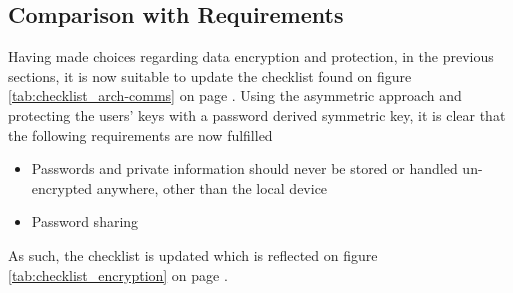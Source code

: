 		\subsection{Comparison with Requirements}
			Having made choices regarding data encryption and protection, in the previous sections, it is now suitable to update the checklist found on figure \ref{tab:checklist_arch-comms} on page \pageref{tab:checklist_arch-comms}. Using the asymmetric approach and protecting the users' keys with a password derived symmetric key, it is clear that the following requirements are now fulfilled
			\begin{itemize}
				\item Passwords and private information should never be stored or handled un-encrypted anywhere, other than the local device
				\item Password sharing
			\end{itemize}
			As such, the checklist is updated which is reflected on figure \ref{tab:checklist_encryption} on page \pageref{tab:checklist_encryption}.

